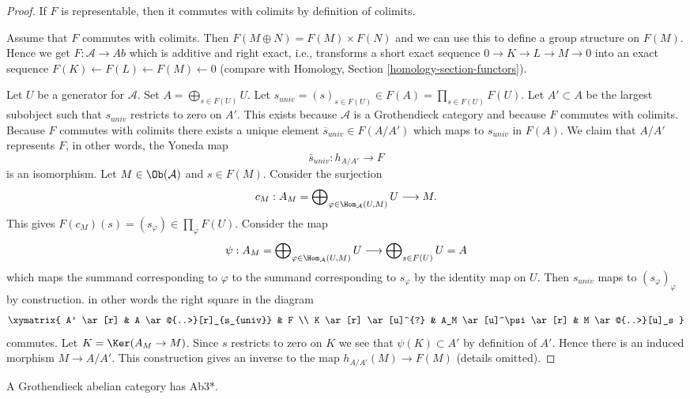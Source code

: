 \begin{proof}
If $F$ is representable, then it commutes with colimits by definition
of colimits.

\medskip\noindent
Assume that $F$ commutes with colimits. Then $F(M \oplus N) = F(M) \times F(N)$
and we can use this to define a group structure on $F(M)$. Hence we get
$F : \mathcal{A} \to \textit{Ab}$ which is additive and right exact, i.e.,
transforms a short exact sequence $0 \to K \to L \to M \to 0$ into an exact
sequence $F(K) \leftarrow F(L) \leftarrow F(M) \leftarrow 0$ (compare with
Homology, Section \ref{homology-section-functors}).

\medskip\noindent
Let $U$ be a generator for $\mathcal{A}$. Set $A = \bigoplus_{s \in F(U)} U$.
Let $s_{univ} = (s)_{s \in F(U)} \in F(A) = \prod_{s \in F(U)} F(U)$. Let
$A' \subset A$ be the largest subobject such that $s_{univ}$ restricts to
zero on $A'$. This exists because $\mathcal{A}$ is a Grothendieck category
and because $F$ commutes with colimits. Because $F$ commutes with colimits
there exists a unique element $\overline{s}_{univ} \in F(A/A')$ which
maps to $s_{univ}$ in $F(A)$. We claim that $A/A'$ represents $F$, in
other words, the Yoneda map
$$
\overline{s}_{univ} : h_{A/A'} \longrightarrow F
$$
is an isomorphism. Let $M \in \Ob(\mathcal{A})$ and $s \in F(M)$. Consider
the surjection
$$
c_M :
A_M = \bigoplus\nolimits_{\varphi \in \Hom_\mathcal{A}(U, M)} U
\longrightarrow
M.
$$
This gives $F(c_M)(s) = (s_\varphi) \in \prod_\varphi F(U)$.
Consider the map
$$
\psi :
A_M = \bigoplus\nolimits_{\varphi \in \Hom_\mathcal{A}(U, M)} U
\longrightarrow
\bigoplus\nolimits_{s \in F(U)} U = A
$$
which maps the summand corresponding to $\varphi$ to the summand
corresponding to $s_\varphi$ by the identity map on $U$. Then $s_{univ}$
maps to $(s_\varphi)_\varphi$ by construction.
in other words the right square in the diagram
$$
\xymatrix{
A' \ar[r] &
A \ar@{..>}[r]_{s_{univ}} & F \\
K \ar[r] \ar[u]^{?} & A_M \ar[u]^\psi \ar[r] &
M \ar@{..>}[u]_s
}
$$
commutes. Let $K = \Ker(A_M \to M)$. Since $s$ restricts to zero
on $K$ we see that $\psi(K) \subset A'$ by definition of $A'$. Hence there
is an induced morphism $M \to A/A'$. This construction gives an inverse
to the map $h_{A/A'}(M) \to F(M)$ (details omitted).
\end{proof}

\begin{lemma}
\label{lemma-grothendieck-products}
A Grothendieck abelian category has Ab3*.
\end{lemma}

